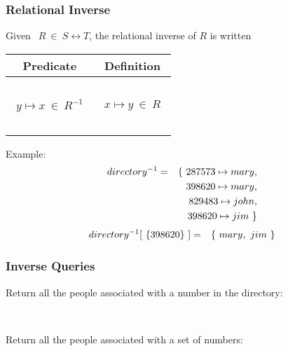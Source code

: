 \documentclass{beamer}
\begin{document}
\begin{frame}

\frametitle{Relational Inverse}

Given $~~R ~\in~ S\rel T $, the \alert{relational inverse} of  $R$ is  written ~


\begin{center}
\begin{tabular}{|c|c|}
\hline
Predicate & Definition \\[2pt] \hline
~&\\
$~~y\mapsto x   ~\in~ R^{-1}   ~~$ &  $~~x\mapsto y ~\in~ R~~$  \\
~&\\ \hline\end{tabular}
\end{center}

Example:
\begin{eqnarray*}
    directory^{-1} & = &
    \{~ 287573\mapsto mary , \\
&&~~  398620\mapsto mary , \\
&&~~  829483\mapsto john , \\
&&~~  398620\mapsto jim   ~\}
\end{eqnarray*}
%
\begin{eqnarray*}
    directory^{-1}[~\{398620\}~] & = &
    \{~  mary,~ jim ~\}
\end{eqnarray*}




\end{frame}



\begin{frame}


\frametitle{ Inverse Queries }

Return all the people associated with a number in the directory:

~

Return all the people associated with a set of numbers:

\end{frame}
\end{document}
